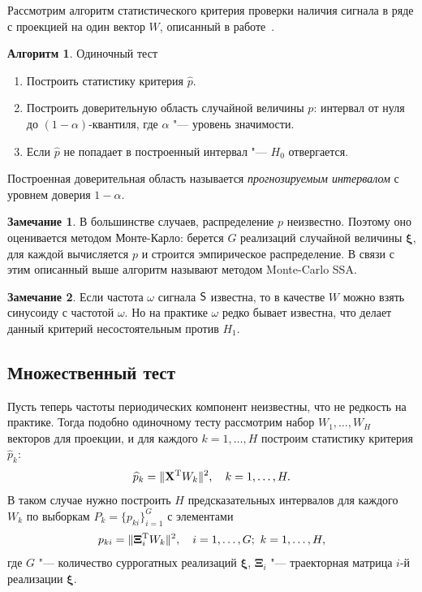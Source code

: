 \documentclass[specialist,
substylefile = spbu_report.rtx,
subf,href,colorlinks=true, 12pt]{disser}
\theoremstyle{definition}
\newtheorem{algorithm}{Алгоритм}
\newtheorem{remark}{Замечание}
\newcommand{\bfxi}{\boldsymbol{\xi}}
\begin{document}
Рассмотрим алгоритм статистического критерия проверки наличия сигнала в ряде с проекцией на один вектор $W$, описанный в работе~\cite{Golyandina_2023}.
\begin{algorithm}{Одиночный тест~\cite{Golyandina_2023}}
	\begin{enumerate}
		\item Построить статистику критерия $\widehat p$.
		\item Построить доверительную область случайной величины $p$: интервал от нуля до $(1-\alpha)$-квантиля, где $\alpha$ "--- уровень значимости.
		\item Если $\widehat p$	не попадает в построенный интервал "--- $H_0$ отвергается.
	\end{enumerate}
\end{algorithm}
Построенная доверительная область называется \textit{прогнозируемым интервалом} с уровнем доверия $1-\alpha$.
\begin{remark}
В большинстве случаев, распределение $p$ неизвестно. Поэтому оно оценивается методом Монте-Карло: берется $G$ реализаций случайной величины $\boldsymbol\xi$, для каждой вычисляется $p$ и строится эмпирическое распределение. В связи с этим описанный выше алгоритм называют методом Monte-Carlo SSA.
\end{remark}
\begin{remark}
Если частота $\omega$ сигнала $\mathsf{S}$ известна, то в качестве $W$ можно взять синусоиду с частотой $\omega$. Но на практике $\omega$ редко бывает известна, что делает данный критерий несостоятельным против $H_1$.
\end{remark}
\subsection{Множественный тест}\label{sect:multiple_test}
Пусть теперь частоты периодических компонент неизвестны, что не редкость на практике. Тогда подобно одиночному тесту рассмотрим набор $W_1,\ldots,W_H$ векторов для проекции, и для каждого $k=1,\ldots,H$ построим статистику критерия $\widehat p_k$:
\begin{equation}\label{eq:mc-ssa_statisctics}
	\widehat p_k = \|\mathbf{X}^{\mathrm{T}} W_k\|^2,\quad k=1,\ldots,H.
\end{equation}
В таком случае нужно построить $H$ предсказательных интервалов для каждого $W_k$ по выборкам $P_k=\{p_{ki}\}_{i=1}^G$ с элементами
\begin{equation}\label{eq:mc-ssa_h0}
	p_{ki}=\|\mathbf{\Xi}_i^\rmT W_k\|^2,\quad i=1,\ldots,G;\ k=1,\ldots,H,
\end{equation}
где $G$ "--- количество суррогатных реализаций $\bfxi$, $\mathbf{\Xi}_i$ "--- траекторная матрица $i$-й реализации $\bfxi$. 
\end{document}
